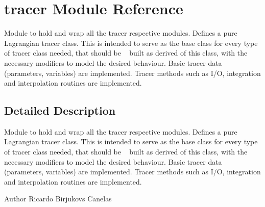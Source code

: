 \hypertarget{namespacetracer}{}\section{tracer Module Reference}
\label{namespacetracer}


Module to hold and wrap all the tracer respective modules. Defines a pure Lagrangian tracer class. This is intended to serve as the base class for every type of tracer class needed, that should be ~\newline
 built as derived of this class, with the necessary modifiers to model the desired behaviour. Basic tracer data (parameters, variables) are implemented. Tracer methods such as I/O, integration and interpolation routines are implemented.  




\subsection{Detailed Description}
Module to hold and wrap all the tracer respective modules. Defines a pure Lagrangian tracer class. This is intended to serve as the base class for every type of tracer class needed, that should be ~\newline
 built as derived of this class, with the necessary modifiers to model the desired behaviour. Basic tracer data (parameters, variables) are implemented. Tracer methods such as I/O, integration and interpolation routines are implemented. 

\begin{DoxyAuthor}{Author}
Ricardo Birjukovs Canelas 
\end{DoxyAuthor}
